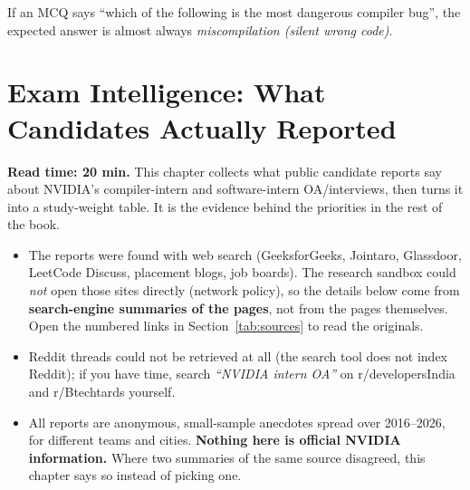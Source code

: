 \documentclass[10pt,a4paper,openany,oneside]{report}
\begin{document}
\begin{tipbox}
If an MCQ says ``which of the following is the most dangerous compiler bug'', the expected answer is almost always \emph{miscompilation (silent wrong code)}.
\end{tipbox}


\chapter{Exam Intelligence: What Candidates Actually Reported}
\label{ch:intel}

\begin{chapbox}
\textbf{Read time: 20 min.} This chapter collects what public candidate reports say about NVIDIA's compiler-intern and software-intern
OA/interviews, then turns it into a study-weight table. It is the evidence behind the priorities in the rest of the book.
\end{chapbox}

\begin{trapbox}
\begin{itemize}
\item The reports were found with web search (GeeksforGeeks, Jointaro, Glassdoor, LeetCode Discuss, placement blogs, job boards). The
research sandbox could \emph{not} open those sites directly (network policy), so the details below come from \textbf{search-engine
summaries of the pages}, not from the pages themselves. Open the numbered links in Section~\ref{tab:sources} to read the originals.
\item Reddit threads could not be retrieved at all (the search tool does not index Reddit); if you have time, search
\emph{``NVIDIA intern OA''} on r/developersIndia and r/Btechtards yourself.
\item All reports are anonymous, small-sample anecdotes spread over 2016--2026, for different teams and cities. \textbf{Nothing here is
official NVIDIA information.} Where two summaries of the same source disagreed, this chapter says so instead of picking one.
\end{itemize}
\end{trapbox}
\end{document}
